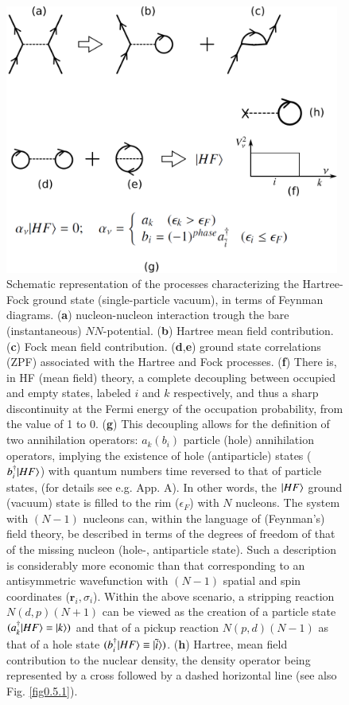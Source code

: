 \begin{figure}[h!]
\centerline {
\includegraphics*[width=11cm]{introduccion/figs/figintro4}
}
\caption{Schematic representation of the processes characterizing the Hartree-Fock ground state (single-particle vacuum), in terms of Feynman diagrams. (\textbf{a}) nucleon-nucleon interaction trough the bare (instantaneous) $NN$-potential. (\textbf{b}) Hartree mean field contribution. (\textbf{c}) Fock mean field contribution. (\textbf{d},\textbf{e}) ground state correlations (ZPF) associated with the Hartree and Fock processes. (\textbf{f}) There is, in HF (mean field) theory, a complete decoupling between occupied and empty states, labeled $i$ and $k$ respectively, and thus a sharp discontinuity at the Fermi energy of the occupation probability, from the value of 1 to 0. (\textbf{g}) This decoupling allows for the definition of two annihilation operators: $a_k(b_i)$ particle (hole) annihilation operators,   implying the existence of hole (antiparticle) states ($b^\dagger_i|{HF} \rangle$) with quantum numbers time reversed to that of particle states, (for details see e.g. \cite{Brink:05} App. A). In other words, the $|{HF} \rangle$ ground (vacuum) state is filled to the rim ($\epsilon_F$) with $N$ nucleons. The system with $(N-1)$ nucleons can, within the language of (Feynman's) field theory, be described in terms of the degrees of freedom of that of the missing nucleon (hole-, antiparticle state). Such a description is  considerably more economic than that corresponding to an antisymmetric wavefunction with $(N-1)$ spatial and spin coordinates ($\mathbf r_i,\sigma_i$). Within the above scenario, a stripping reaction $N(d,p)(N+1)$ can be viewed as the creation of a particle state $(a^\dagger_k|{HF} \rangle=|{k} \rangle)$ and that of a pickup reaction $N(p,d)(N-1)$ as that of a hole state $(b^\dagger_i|{HF} \rangle\equiv|{\tilde i} \rangle)$. (\textbf{h}) Hartree, mean field contribution to the  nuclear density, the density operator being represented by a cross followed by a dashed horizontal line (see also Fig. \ref{fig0.5.1}).}
\label{figintro4}
\end{figure}

